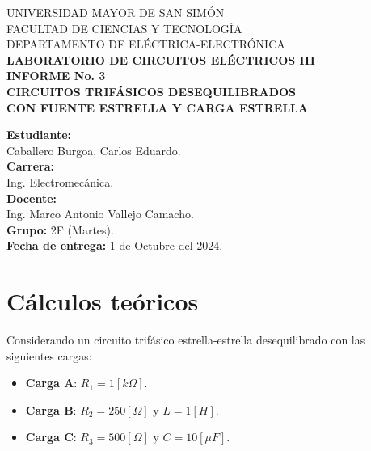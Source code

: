 \documentclass[letter,11pt]{article}
\begin{document}
\begin{titlepage}
    \begin{center}
        {\Large UNIVERSIDAD MAYOR DE SAN SIMÓN}\\
        \vspace*{0.15cm}
        {\large FACULTAD DE CIENCIAS Y TECNOLOGÍA}\\
        \vspace*{0.10cm}
        DEPARTAMENTO DE ELÉCTRICA-ELECTRÓNICA\\
        \vspace*{3.0cm}
        {\Large \textbf{LABORATORIO DE CIRCUITOS ELÉCTRICOS III}}\\
        \vspace*{0.3cm}
        {\Large \textbf{INFORME No. 3}}\\
        \vspace*{3.5cm}
        {\Large \textbf{CIRCUITOS TRIFÁSICOS DESEQUILIBRADOS \\
        CON FUENTE ESTRELLA Y CARGA ESTRELLA}}\\
    \end{center}

    \vspace*{5.8cm}
    \leftskip=7.95cm
    \noindent
    \textbf{Estudiante:}\\
    Caballero Burgoa, Carlos Eduardo.\\
    \newline
    \textbf{Carrera:}\\
    Ing. Electromecánica.\\
    \newline
    \textbf{Docente:}\\
    Ing. Marco Antonio Vallejo Camacho.\\
    \newline
    \textbf{Grupo:} 2F (Martes).\\
\textbf{Fecha de entrega:} 1 de Octubre del 2024.\\
\end{titlepage}

\section{Cálculos teóricos}
Considerando un circuito trifásico estrella-estrella desequilibrado con las
siguientes cargas:

\begin{itemize}
    \item \textbf{Carga A}: $R_1=1[k\Omega]$.
    \item \textbf{Carga B}: $R_2=250[\Omega]$ y $L=1[H]$.
    \item \textbf{Carga C}: $R_3=500[\Omega]$ y $C=10[\mu F]$.
\end{itemize}
\end{document}
